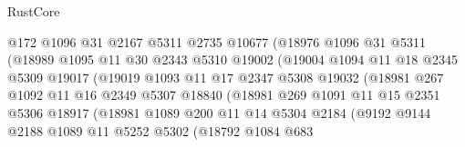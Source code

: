 \begin{lexlean}{RustCore}
\begin{coremodule}
                          @172
                          @1096
                          @31
                          @2167
                          @5311
                          @2735
                          @10677
                          (@18976
                            @1096
                            @31
                            @5311
                            (@18989
                              @1095
                              @11
                              @30
                              @2343
                              @5310
                              @19002
                              (@19004
                                @1094
                                @11
                                @18
                                @2345
                                @5309
                                @19017
                                (@19019
                                  @1093
                                  @11
                                  @17
                                  @2347
                                  @5308
                                  @19032
                                  (@18981
                                    @267
                                    @1092
                                    @11
                                    @16
                                    @2349
                                    @5307
                                    @18840
                                    (@18981
                                      @269
                                      @1091
                                      @11
                                      @15
                                      @2351
                                      @5306
                                      @18917
                                      (@18981
                                        @1089
                                        @200
                                        @11
                                        @14
                                        @5304
                                        @2184
                                        (@9192
                                          @9144
                                          @2188
                                          @1089
                                          @11
                                          @5252
                                          @5302
                                          (@18792
                                            @1084
                                            @683

\end{coremodule}
\end{lexlean}
